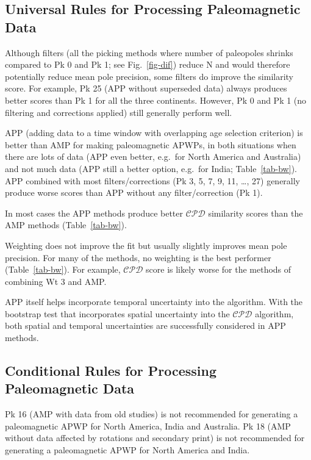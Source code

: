 \subsection{Universal Rules for Processing Paleomagnetic Data}
%
\begin{description}
  \item Although filters (all the picking methods where number of paleopoles
    shrinks compared to Pk 0 and Pk 1; see Fig.~\ref{fig-dif}) reduce N and
    would therefore potentially reduce mean pole precision, some filters do
    improve the similarity score. For example, Pk 25 (APP without superseded
    data) always produces better scores than Pk 1 for all the three continents.
    However, Pk 0 and Pk 1 (no filtering and corrections applied) still
    generally perform well.
  \item APP (adding data to a time window with overlapping age selection
    criterion) is better than AMP for making paleomagnetic APWPs, in both
    situations when there are lots of data (APP even better, e.g.\ for North
    America and Australia) and not much data (APP still a better option, e.g.\
    for India; Table~\ref{tab-bw}). APP combined with most filters/corrections
    (Pk 3, 5, 7, 9, 11, \ldots, 27) generally produce worse scores than APP
    without any filter/correction (Pk 1).
  \item In most cases the APP methods produce better $\mathcal{CPD}$ similarity
    scores than the AMP methods (Table~\ref{tab-bw}).
  \item Weighting does not improve the fit but usually slightly improves mean
    pole precision. For many of the methods, no weighting is the best performer
    (Table~\ref{tab-bw}). For example, $\mathcal{CPD}$ score is likely worse for
    the methods of combining Wt 3 and AMP\@.
  \item APP itself helps incorporate temporal uncertainty into the algorithm.
    With the bootstrap test that incorporates spatial uncertainty into the
    $\mathcal{CPD}$ algorithm, both spatial and temporal uncertainties are
    successfully considered in APP methods.
\end{description}

\subsection{Conditional Rules for Processing Paleomagnetic Data}
%
\begin{description}
  \item Pk 16 (AMP with data from old studies) is not recommended for generating
    a paleomagnetic APWP for North America, India and Australia. Pk 18 (AMP
    without data affected by rotations and secondary print) is not recommended
    for generating a paleomagnetic APWP for North America and India.
\end{description}

